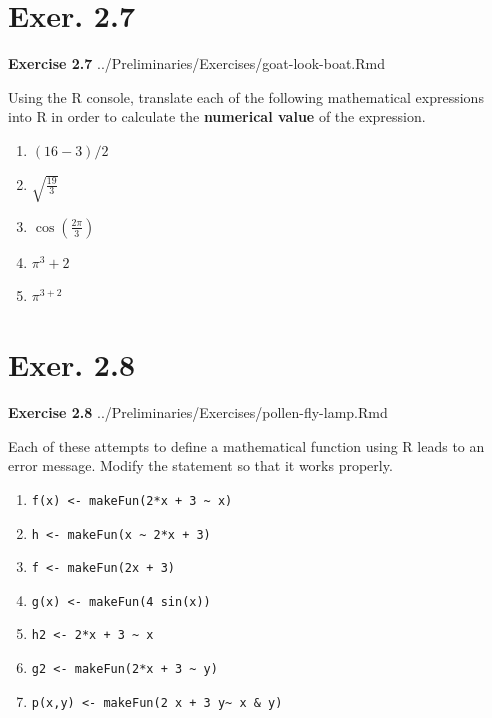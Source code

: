 \documentclass[
  letterpaper,
  DIV=11,
  numbers=noendperiod,
  oneside]{article}
\providecommand{\tightlist}{%
  \setlength{\itemsep}{0pt}\setlength{\parskip}{0pt}}\usepackage{longtable,booktabs,array}
\begin{document}
\begin{multicols}{2}
\hypertarget{exer.-2.7}{%
\section*{Exer. 2.7}\label{exer.-2.7}}

\textbf{Exercise 2.7} ../Preliminaries/Exercises/goat-look-boat.Rmd

Using the R console, translate each of the following mathematical
expressions into R in order to calculate the \textbf{numerical value} of
the expression.

\begin{enumerate}
\def\labelenumi{\roman{enumi}.}
\tightlist
\item
  \((16 - 3)/2\)
\item
  \(\sqrt{\frac{19}{3}}\)
\item
  \(\cos(\frac{2 \pi}{3})\)
\item
  \(\pi^3 + 2\)
\item
  \(\pi^{3+2}\)
\end{enumerate}

\hypertarget{exer.-2.8}{%
\section*{Exer. 2.8}\label{exer.-2.8}}

\textbf{Exercise 2.8} ../Preliminaries/Exercises/pollen-fly-lamp.Rmd

Each of these attempts to define a mathematical function using R leads
to an error message. Modify the statement so that it works properly.

\begin{enumerate}
\def\labelenumi{\arabic{enumi}.}
\tightlist
\item
  \texttt{f(x)\ \textless{}-\ makeFun(2*x\ +\ 3\ \textasciitilde{}\ x)}
\item
  \texttt{h\ \textless{}-\ makeFun(x\ \textasciitilde{}\ 2*x\ +\ 3)}
\item
  \texttt{f\ \textless{}-\ makeFun(2x\ +\ 3)}
\item
  \texttt{g(x)\ \textless{}-\ makeFun(4\ sin(x))}
\item
  \texttt{h2\ \textless{}-\ 2*x\ +\ 3\ \textasciitilde{}\ x}
\item
  \texttt{g2\ \textless{}-\ makeFun(2*x\ +\ 3\ \textasciitilde{}\ y)}
\item
  \texttt{p(x,y)\ \textless{}-\ makeFun(2\ x\ +\ 3\ y\textasciitilde{}\ x\ \&\ y)}
\end{enumerate}


\end{multicols}
\end{document}
